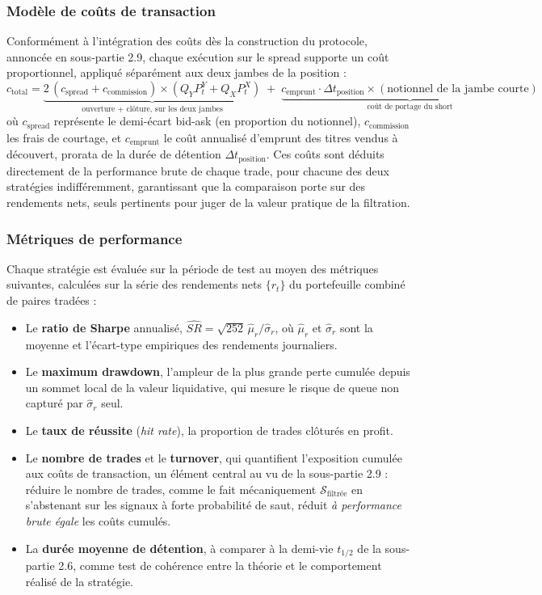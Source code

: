 \documentclass{article}
\begin{document}
\subsubsection*{Modèle de coûts de transaction}
Conformément à l'intégration des coûts dès la construction du protocole, annoncée en sous-partie 2.9, chaque exécution sur le spread supporte un coût proportionnel, appliqué séparément aux deux jambes de la position :
\begin{equation}
c_{\text{total}} = \underbrace{2\,(c_{\text{spread}} + c_{\text{commission}})\times(Q_Y P^Y_t + Q_X P^X_t)}_{\text{ouverture + clôture, sur les deux jambes}} \;+\; \underbrace{c_{\text{emprunt}}\cdot \Delta t_{\text{position}}\times(\text{notionnel de la jambe courte})}_{\text{coût de portage du short}}
\end{equation}
où $c_{\text{spread}}$ représente le demi-écart bid-ask (en proportion du notionnel), $c_{\text{commission}}$ les frais de courtage, et $c_{\text{emprunt}}$ le coût annualisé d'emprunt des titres vendus à découvert, prorata de la durée de détention $\Delta t_{\text{position}}$. 
Ces coûts sont déduits directement de la performance brute de chaque trade, pour chacune des deux stratégies indifféremment, garantissant que la comparaison porte sur des rendements nets, seuls pertinents pour juger de la valeur pratique de la filtration.
\subsubsection*{Métriques de performance}
Chaque stratégie est évaluée sur la période de test au moyen des métriques suivantes, calculées sur la série des rendements nets $\{r_t\}$ du portefeuille combiné de paires tradées :
\begin{itemize}
\item Le \textbf{ratio de Sharpe} annualisé, $\widehat{SR}=\sqrt{252}\,\hat\mu_r/\hat\sigma_r$, où $\hat\mu_r$ et $\hat\sigma_r$ sont la moyenne et l'écart-type empiriques des rendements journaliers.
\item Le \textbf{maximum drawdown}, l'ampleur de la plus grande perte cumulée depuis un sommet local de la valeur liquidative, qui mesure le risque de queue non capturé par $\hat\sigma_r$ seul.
\item Le \textbf{taux de réussite} (\emph{hit rate}), la proportion de trades clôturés en profit.
\item Le \textbf{nombre de trades} et le \textbf{turnover}, qui quantifient l'exposition cumulée aux coûts de transaction, un élément central au vu de la sous-partie 2.9 : réduire le nombre de trades, comme le fait mécaniquement $\mathcal{S}_{\text{filtrée}}$ en s'abstenant sur les signaux à forte probabilité de saut, réduit \emph{à performance brute égale} les coûts cumulés.
\item La \textbf{durée moyenne de détention}, à comparer à la demi-vie $t_{1/2}$ de la sous-partie 2.6, comme test de cohérence entre la théorie et le comportement réalisé de la stratégie.
\end{itemize}
\end{document}
